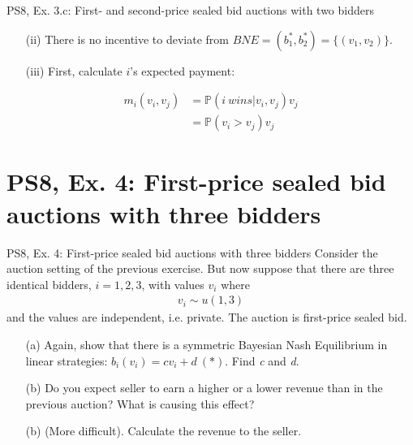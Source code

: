 \begin{frame}{PS8, Ex. 3.c: First- and second-price sealed bid auctions with two bidders}
\begin{multicols}{2}
\begin{itemize}
        \item[(ii)] There is no incentive to deviate from $BNE=(b_1^*,b_2^*)=\{(v_1,v_2)\}$.
        \item[(iii)] First, calculate $i$'s expected payment:
      \end{itemize}
      \vspace{-12pt}
      \begin{align*}
        m_i(v_i,v_j)&=\mathbb{P}(i\ wins|v_i,v_j)v_j\\
                    &=\mathbb{P}(v_i>v_j)v_j
      \end{align*}
      \vfill\null
    \end{multicols}
\end{frame}



\section{PS8, Ex. 4: First-price sealed bid auctions with three bidders}

\begin{frame}{PS8, Ex. 4: First-price sealed bid auctions with three bidders}
    Consider the auction setting of the previous exercise. But now suppose that there are three identical bidders, $i = 1, 2, 3$, with values $v_i$ where
    \begin{align*}
      v_i\sim u(1, 3)
    \end{align*}
    and the values are independent, i.e. private. The auction is first-price sealed bid.
    \begin{itemize}
      \item[(a)] Again, show that there is a symmetric Bayesian Nash Equilibrium in linear strategies: $b_i(v_i) = cv_i + d\ (*)$. Find \textit{c} and \textit{d}.
      \item[(b)] Do you expect seller to earn a higher or a lower revenue than in the previous auction? What is causing this effect?
      \item[(b)] (More difficult). Calculate the revenue to the seller.
    \end{itemize}
    \vfill\null
\end{frame}

